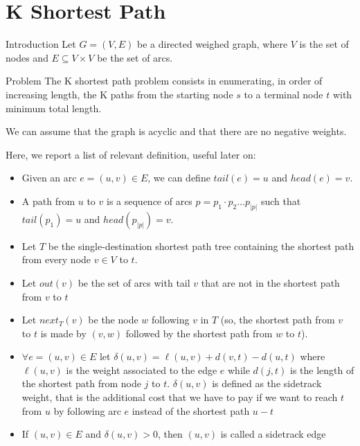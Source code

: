 \section{K Shortest Path}

\begin{frame}[plain]{}
    \sectionpage
\end{frame}

\begin{frame}[allowframebreaks]{Introduction}
    Let $G=(V,E)$ be a directed weighed graph, where $V$ is the set of nodes and $E \subseteq V \times V$ be the set of arcs. 
    
    \begin{block}{Problem}
    The K shortest path problem consists in enumerating, in order of increasing length, the K paths from the starting node $s$ to a terminal node $t$ with minimum total length.
    \end{block}
    
    We can assume that the graph is acyclic and that there are no negative weights.
    
    \framebreak
    Here, we report a list of relevant definition, useful later on:
    \begin{itemize}
        \item Given an arc $e=(u,v) \in E$, we can define $tail(e)=u$ and $head(e)=v$.
        \item A path from $u$ to $v$ is a sequence of arcs $p=p_1\cdot p_2 \dots p_{|p|}$ such that $tail(p_1)=u$ and $head(p_{|p|})=v$.
        \item Let $T$ be the single-destination shortest path tree containing the shortest path from every node $v \in V$ to $t$.
        \item Let $out(v)$ be the set of arcs with tail $v$ that are not in the shortest path from $v$ to $t$
        \item Let $next_T(v)$ be the node $w$ following $v$ in $T$ (so, the shortest path from $v$ to $t$ is made by $(v,w)$ followed by the shortest path from $w$ to $t$).
        \item $\forall e=(u,v) \in E$ let $\delta(u,v) = \ell(u,v) + d(v,t) - d(u,t)$ where $\ell(u,v)$ is the weight associated to the edge $e$ while $d(j,t)$ is the length of the shortest path from node $j$ to $t$. $\delta(u,v)$ is defined as the sidetrack weight, that is the additional cost that we have to pay if we want to reach $t$ from $u$ by following arc $e$ instead of the shortest path $u-t$
        \item If $(u,v) \in E$ and $\delta(u,v)>0$, then $(u,v)$ is called a sidetrack edge
    \end{itemize}
    
\end{frame}

